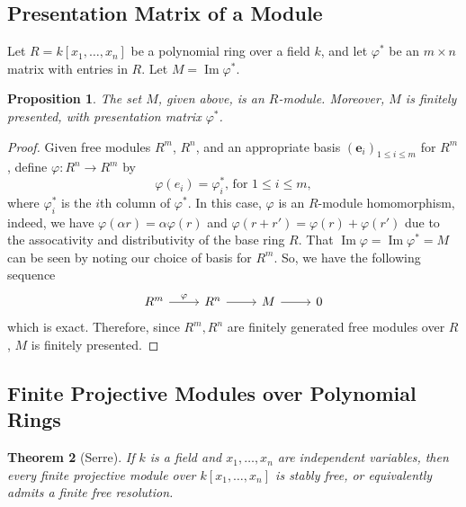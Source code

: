 \documentclass{amsart}
\newtheorem{theorem}{Theorem}[section]
\newtheorem{proposition}[theorem]{Proposition}
\theoremstyle{definition}
\theoremstyle{remark}
\DeclareMathOperator{\Ima}{Im}
\numberwithin{equation}{section}
\begin{document}
\subsection{Presentation Matrix of a Module}

Let $R = k[x_1, \ldots, x_n]$ be a polynomial ring over a field $k$, and let $\varphi^{*}$ be an $m \times n$ matrix with entries in $R$. Let $M = \Ima \varphi^{*}$.

\begin{proposition}
  The set $M$, given above, is an $R$-module. Moreover, $M$ is finitely presented, with presentation matrix $\varphi^{*}$.
\end{proposition}

\begin{proof}
  Given free modules $R^m$, $R^n$, and an appropriate basis $(\mathbf{e}_i)_{1 \leq i \leq m}$ for $R^m$, define $\varphi: R^n \to R^m$ by
  \begin{equation*}
    \varphi(e_i) = \varphi^{*}_i \text{, for } 1 \leq i \leq m,
  \end{equation*}
  where $\varphi^{*}_i$ is the $i$th column of $\varphi^{*}$. In this case, $\varphi$ is an $R$-module homomorphism, indeed, we have $\varphi(\alpha r) = \alpha \varphi(r)$ and $\varphi(r + r') = \varphi(r) + \varphi(r')$ due to the assocativity and distributivity of the base ring $R$. That $\Ima \varphi = \Ima \varphi^{*} = M$ can be seen by noting our choice of basis for $R^m$. So, we have the following sequence
  \begin{equation*}
    \begin{tikzcd}
      R^m \arrow[r]{}{\varphi} & R^n \arrow[r] & M \arrow[r] & 0
    \end{tikzcd}
  \end{equation*}
  which is exact.  Therefore, since $R^m, R^n$ are finitely generated free modules over $R$, $M$ is finitely presented.
\end{proof}

\subsection{Finite Projective Modules over Polynomial Rings}

\begin{theorem}[Serre]
  If $k$ is a field and $x_1, \dots, x_n$ are independent variables, then every finite projective module over $k[x_1, \dots, x_n]$ is stably free, or equivalently admits a finite free resolution. 
\end{theorem}
\end{document}

